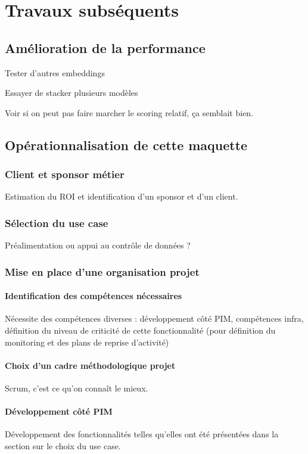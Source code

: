 \part{Travaux subséquents}

    \chapter{Amélioration de la performance}
        Tester d'autres embeddings
        
        Essayer de stacker plusieurs modèles
        
        Voir si on peut pas faire marcher le scoring relatif, ça semblait bien.

    \chapter{Opérationnalisation de cette maquette}    
        \section{Client et sponsor métier}
        Estimation du ROI et identification d'un sponsor et d'un client.

        \section{Sélection du use case}
        Préalimentation ou appui au contrôle de données ?

        \section{Mise en place d'une organisation projet}
            \subsection{Identification des compétences nécessaires}
            Nécessite des compétences diverses : développement côté PIM, compétences infra, définition du niveau de criticité de cette fonctionnalité (pour définition du monitoring et des plans de reprise d'activité)
            \subsection{Choix d'un cadre méthodologique projet}
            Scrum, c'est ce qu'on connaît le mieux.
            \subsection{Développement côté PIM}
            Développement des fonctionnalités telles qu'elles ont été présentées dans la section sur le choix du use case.


